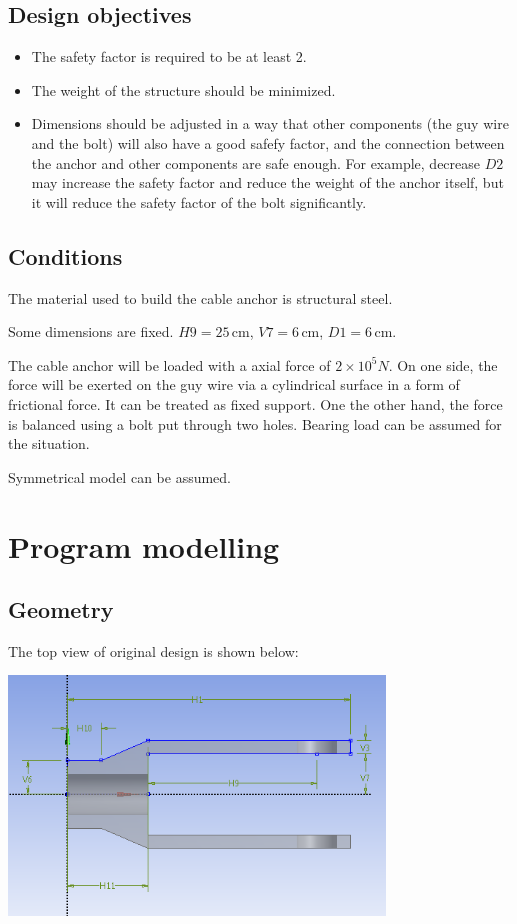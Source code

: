 \documentclass[a4paper,14pt]{extarticle}
\newcommand{\cm}{\,\si{\centi\meter}}
\begin{document}
\subsection{Design objectives}
\begin{itemize}
\item The safety factor is required to be at least 2. 
\item The weight of the structure should be minimized.
\item Dimensions should be adjusted in a way that other components (the guy wire and the bolt) will also have a good safefy factor, and the connection between the anchor and other components are safe enough. For example, decrease $D2$ may increase the safety factor and reduce the weight of the anchor itself, but it will reduce the safety factor of the bolt significantly.
\end{itemize}

\subsection{Conditions}
The material used to build the cable anchor is structural steel.

Some dimensions are fixed.  $H9=25\cm$, $V7=6\cm$, $D1 = 6\cm$.

The cable anchor will be loaded with a axial force of $2\times10^5 N$. On one side, the force will be exerted on the guy wire via a cylindrical surface in a form of frictional force. It can be treated as fixed support. One the other hand, the force is balanced using a bolt put through two holes. Bearing load can be assumed for the situation.

Symmetrical model can be assumed. 
\section{Program modelling}
\subsection{Geometry}
The top view of original design is shown below:

\begin{center}\includegraphics[width=0.75\textwidth]{2D_ORIGIN.png}\end{center}
\end{document}

